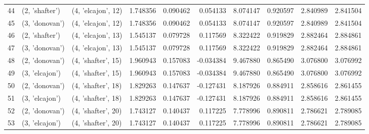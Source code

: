 \begin{tabular}{lllrrrrrrr}
44 &   (2, 'shafter') &  (4, 'elcajon', 12) &  1.748356 &   0.090462 &  0.054133 &   8.074147 &  0.920597 &   2.840989 &  2.841504 \\
45 &   (3, 'donovan') &  (4, 'elcajon', 12) &  1.748356 &   0.090462 &  0.054133 &   8.074147 &  0.920597 &   2.840989 &  2.841504 \\
46 &   (2, 'shafter') &  (4, 'elcajon', 13) &  1.545137 &   0.079728 &  0.117569 &   8.322422 &  0.919829 &   2.882464 &  2.884861 \\
47 &   (3, 'donovan') &  (4, 'elcajon', 13) &  1.545137 &   0.079728 &  0.117569 &   8.322422 &  0.919829 &   2.882464 &  2.884861 \\
48 &   (2, 'donovan') &  (4, 'shafter', 15) &  1.960943 &   0.157083 & -0.034384 &   9.467880 &  0.865490 &   3.076800 &  3.076992 \\
49 &   (3, 'elcajon') &  (4, 'shafter', 15) &  1.960943 &   0.157083 & -0.034384 &   9.467880 &  0.865490 &   3.076800 &  3.076992 \\
50 &   (2, 'donovan') &  (4, 'shafter', 18) &  1.829263 &   0.147637 & -0.127431 &   8.187926 &  0.884911 &   2.858616 &  2.861455 \\
51 &   (3, 'elcajon') &  (4, 'shafter', 18) &  1.829263 &   0.147637 & -0.127431 &   8.187926 &  0.884911 &   2.858616 &  2.861455 \\
52 &   (2, 'donovan') &  (4, 'shafter', 20) &  1.743127 &   0.140437 &  0.117225 &   7.778996 &  0.890811 &   2.786621 &  2.789085 \\
53 &   (3, 'elcajon') &  (4, 'shafter', 20) &  1.743127 &   0.140437 &  0.117225 &   7.778996 &  0.890811 &   2.786621 &  2.789085 \\
\bottomrule
\end{tabular}
